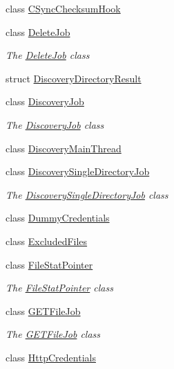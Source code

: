 \begin{DoxyCompactItemize}
class \hyperlink{class_o_c_c_1_1_c_sync_checksum_hook}{C\+Sync\+Checksum\+Hook}
\item 
class \hyperlink{class_o_c_c_1_1_delete_job}{Delete\+Job}
\begin{DoxyCompactList}\small\item\em The \hyperlink{class_o_c_c_1_1_delete_job}{Delete\+Job} class \end{DoxyCompactList}\item 
struct \hyperlink{struct_o_c_c_1_1_discovery_directory_result}{Discovery\+Directory\+Result}
\item 
class \hyperlink{class_o_c_c_1_1_discovery_job}{Discovery\+Job}
\begin{DoxyCompactList}\small\item\em The \hyperlink{class_o_c_c_1_1_discovery_job}{Discovery\+Job} class \end{DoxyCompactList}\item 
class \hyperlink{class_o_c_c_1_1_discovery_main_thread}{Discovery\+Main\+Thread}
\item 
class \hyperlink{class_o_c_c_1_1_discovery_single_directory_job}{Discovery\+Single\+Directory\+Job}
\begin{DoxyCompactList}\small\item\em The \hyperlink{class_o_c_c_1_1_discovery_single_directory_job}{Discovery\+Single\+Directory\+Job} class \end{DoxyCompactList}\item 
class \hyperlink{class_o_c_c_1_1_dummy_credentials}{Dummy\+Credentials}
\item 
class \hyperlink{class_o_c_c_1_1_excluded_files}{Excluded\+Files}
\item 
class \hyperlink{class_o_c_c_1_1_file_stat_pointer}{File\+Stat\+Pointer}
\begin{DoxyCompactList}\small\item\em The \hyperlink{class_o_c_c_1_1_file_stat_pointer}{File\+Stat\+Pointer} class \end{DoxyCompactList}\item 
class \hyperlink{class_o_c_c_1_1_g_e_t_file_job}{G\+E\+T\+File\+Job}
\begin{DoxyCompactList}\small\item\em The \hyperlink{class_o_c_c_1_1_g_e_t_file_job}{G\+E\+T\+File\+Job} class \end{DoxyCompactList}\item 
class \hyperlink{class_o_c_c_1_1_http_credentials}{Http\+Credentials}
\item 

\end{DoxyCompactItemize}
